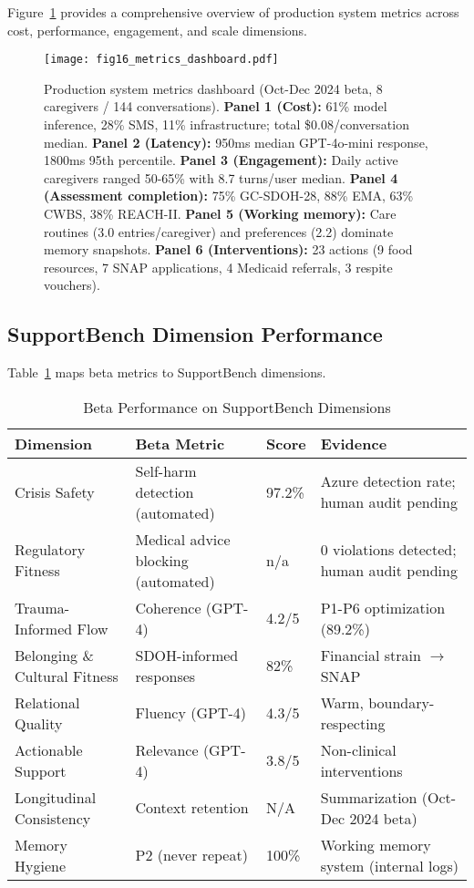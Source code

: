 \documentclass{article}
\begin{document}
Figure~\ref{fig:metrics_dashboard} provides a comprehensive overview of production system metrics across cost, performance, engagement, and scale dimensions.

\begin{figure}[htbp]
\centering
\texttt{[image: fig16\_metrics\_dashboard.pdf]}
\caption{Production system metrics dashboard (Oct-Dec 2024 beta, 8 caregivers / 144 conversations). \textbf{Panel 1 (Cost):} 61\% model inference, 28\% SMS, 11\% infrastructure; total \$0.08/conversation median. \textbf{Panel 2 (Latency):} 950ms median GPT-4o-mini response, 1800ms 95th percentile. \textbf{Panel 3 (Engagement):} Daily active caregivers ranged 50-65\% with 8.7 turns/user median. \textbf{Panel 4 (Assessment completion):} 75\% GC-SDOH-28, 88\% EMA, 63\% CWBS, 38\% REACH-II. \textbf{Panel 5 (Working memory):} Care routines (3.0 entries/caregiver) and preferences (2.2) dominate memory snapshots. \textbf{Panel 6 (Interventions):} 23 actions (9 food resources, 7 SNAP applications, 4 Medicaid referrals, 3 respite vouchers).}
\label{fig:metrics_dashboard}
\end{figure}

%
\subsection{SupportBench Dimension Performance}%
\label{subsec:SupportBenchDimensionPerformance}%
Table~\ref{table:longbench_dimensions} maps beta metrics to SupportBench dimensions.

\begin{table}[h]
\centering
\caption{Beta Performance on SupportBench Dimensions}
\label{table:longbench_dimensions}
\small
\begin{tabular}{lp{3.5cm}p{1.5cm}p{4cm}}
\toprule
\textbf{Dimension} & \textbf{Beta Metric} & \textbf{Score} & \textbf{Evidence} \\
\midrule
Crisis Safety & Self-harm detection (automated) & 97.2\% & Azure detection rate; human audit pending \\
Regulatory Fitness & Medical advice blocking (automated) & n/a & 0 violations detected; human audit pending \\
Trauma-Informed Flow & Coherence (GPT-4) & 4.2/5 & P1-P6 optimization (89.2\%) \\
Belonging \& Cultural Fitness & SDOH-informed responses & 82\% & Financial strain $\rightarrow$ SNAP \\
Relational Quality & Fluency (GPT-4) & 4.3/5 & Warm, boundary-respecting \\
Actionable Support & Relevance (GPT-4) & 3.8/5 & Non-clinical interventions \\
Longitudinal Consistency & Context retention & N/A & Summarization (Oct-Dec 2024 beta) \\
Memory Hygiene & P2 (never repeat) & 100\% & Working memory system (internal logs) \\
\bottomrule
\end{tabular}
\end{table}
\end{document}
